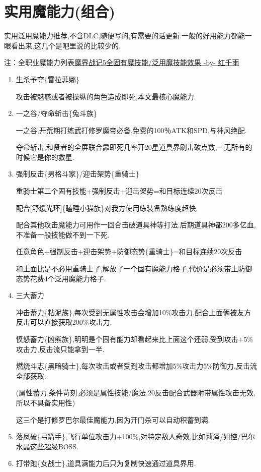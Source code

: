 	\newpage

	\section{实用魔能力(组合)}

	实用泛用魔能力推荐,不含DLC,随便写的,有需要的话更新.一般的好用能力都能一眼看出来,这几个是吧里说的比较少的.

	注：全职业魔能力列表\href{http://tieba.baidu.com/p/3765501530}{魔界战记5全固有魔技能/泛用魔技能效果 -by- 红千雨}

	\begin{enumerate}
		\item
		生杀予夺\{雪拉菲娜\}

		攻击被魅惑或者被操纵的角色造成即死,本文最核心魔能力.

		\item
		一之谷/夺命斩击\{兔斗族\}

		一之谷,开荒期打练武打修罗魔帝必备,免费的100％ATK和SPD,与神风绝配.

		夺命斩击,和贤者的全屏联合靠即死几率开20星道具界刷击破点数,一无所有的时候它是你的救星.

		\item
		强制反击\{男格斗家\}/迎击架势\{重骑士\}

		重骑士第二个固有技能+强制反击+迎击架势=和目标连续20次反击

		配合[舒缓光环]\{瞌睡小猫族\}对我方使用练装备熟练度超快.

		配合其他攻击魔能力可用作一回合击破道具神等打法.后期道具神都200多亿血,不准备一般技能做不到一下死.

		任意角色+强制反击+迎击架势+防御态势\{重骑士\}=和目标连续20次反击

		和上面比是不必用重骑士了,解放了一个固有魔能力格子,代价是必须带上防御态势花费4个泛用魔能力格子.

		\item
		三大蓄力

		冲击蓄力\{粘泥族\},每次受到无属性攻击会增加10\%攻击力,配合上面俩被友方反击可以直接获取200\%攻击力.

		愤怒蓄力\{凶熊族\},明明是个固有能力却看起来比上面这个还弱,受到攻击+5\%攻击力,反击流只能拿到一半.

		燃烧斗志\{黑暗骑士\},每次攻击或者受到攻击都增加5\%攻击力5\%防御力,反击流全部获取.

		(属性蓄力,条件苛刻,必须是属性技能/魔法,20反击配合武器附带属性攻击无效,所以不具备实用性)

		这三个是打修罗巴尔最佳魔能力,因为开门杀可以自动积蓄到满.

		\item
		落凤破\{弓箭手\},飞行单位攻击力+100\%,对特定敌人奇效,比如莉泽/姐控/巴尔水晶这些超级BOSS.

		\item
		打带跑\{女战士\},道具满能力后只为复制快速通过道具界用.

	\end{enumerate}
	
